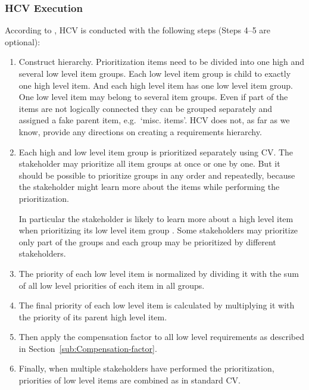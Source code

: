 \subsubsection{HCV Execution}
According to \cite{Berander2006a}, HCV is conducted with the following
steps (Steps 4--5 are optional):

\begin{enumerate}
\item Construct hierarchy. Prioritization items need to be divided into
one high and several low level item groups. Each low level item group
is child to exactly one high level item. And each high level item
has one low level item group. One low level item may belong to several
item groups. Even if part of the items are not logically connected they
can be grouped separately and assigned a fake parent item, e.g.\ `misc.
items'. HCV does not, as far as we know, provide any directions on creating a requirements
hierarchy.

\item Each high and low level item group is prioritized separately using
CV. The stakeholder may prioritize all item groups at once or one by one.
But it should be possible to prioritize groups in any order and repeatedly,
because the stakeholder might learn more about the items while performing the prioritization.

In particular the stakeholder is likely to learn more about a high level item when
prioritizing its low level item group \cite{Brenner2009}. Some stakeholders
may prioritize only part of the groups and each group may be prioritized
by different stakeholders.

\item The priority of each low level item is normalized by dividing it with
the sum of all low level priorities of each item in all groups.


\item The final priority of each low level item is calculated by multiplying
it with the priority of its parent high level item.

\item Then apply the compensation factor to all low level requirements as described
in Section~\ref{sub:Compensation-factor}.

\item Finally, when multiple stakeholders have performed the prioritization, priorities
of low level items are combined as in standard CV.
\end{enumerate}

